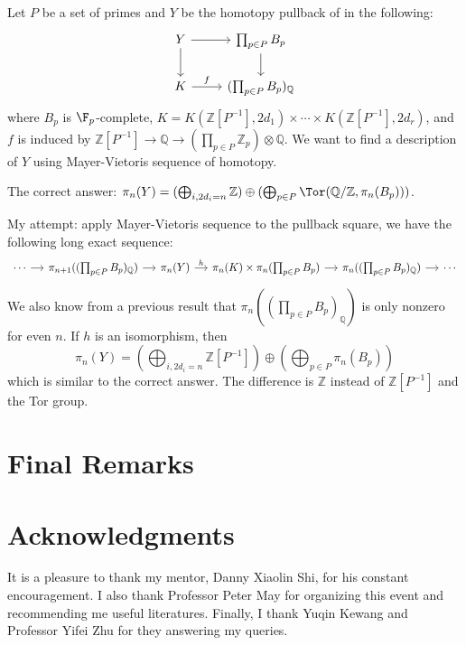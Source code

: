 \documentclass[psamsfonts]{amsart}
\theoremstyle{definition}
\newcommand{\Q}{\mathbb{Q}}
\newcommand{\Z}{\mathbb{Z}}
\numberwithin{equation}{section}
\begin{document}
\noindent Let $P$ be a set of primes and $Y$ be the homotopy pullback of in the following:
\[\begin{tikzcd}
Y\arrow[r]\arrow[d]&\prod_{p\in P}B_p\arrow[d]\\
K\arrow[r,"f"]&(\prod_{p\in P}B_p)_\Q
\end{tikzcd}\]
where $B_p$ is $\F_p$-complete, $K=K(\Z[P^{-1}],2d_1)\times\cdots\times K(\Z[P^{-1}],2d_r)$, and $f$ is induced by $\Z[P^{-1}]\to\Q\to(\prod_{p\in P}\Z_p)\otimes\Q$. We want to find a description of $Y$ using Mayer-Vietoris sequence of homotopy.\medbreak

\noindent The correct answer: $\pi_n(Y)=(\bigoplus_{i,2d_i=n}\Z)\oplus(\bigoplus_{p\in P}\Tor(\Q/\Z,\pi_n(B_p)))$.\medbreak

\noindent My attempt: apply Mayer-Vietoris sequence to the pullback square, we have the following long exact sequence:
\[\begin{tikzcd}[column sep=small]
\cdots\arrow[r]&\pi_{n+1}((\prod_{p\in P}B_p)_\Q)\arrow[r]&\pi_n(Y)\arrow[r,"h"]&\pi_n(K)\times\pi_n(\prod_{p\in P}B_p)\arrow[r]&\pi_n((\prod_{p\in P}B_p)_\Q)\arrow[r]&\cdots
\end{tikzcd}\]
We also know from a previous result that $\pi_n((\prod_{p\in P}B_p)_\Q)$ is only nonzero for even $n$. If $h$ is an isomorphism, then
\[\textstyle{\pi_n(Y)=(\bigoplus_{i,2d_i=n}\Z[P^{-1}])\oplus(\bigoplus_{p\in P}\pi_n(B_p))}\]
which is similar to the correct answer. The difference is $\Z$ instead of $\Z[P^{-1}]$ and the Tor group.


\section{Final Remarks}

\section*{Acknowledgments}

It is a pleasure to thank my mentor, Danny Xiaolin Shi, for his constant encouragement. I also thank Professor Peter May for organizing this event and recommending me useful literatures. Finally, I thank Yuqin Kewang and Professor Yifei Zhu for they answering my queries.
\end{document}
